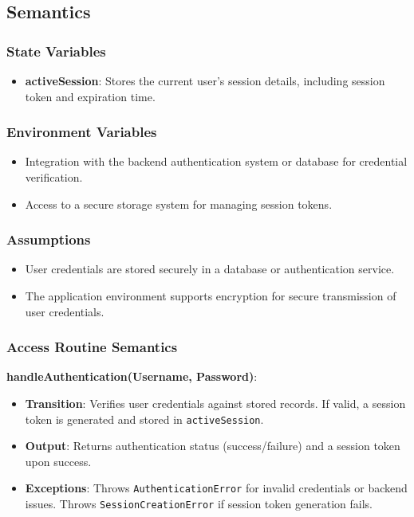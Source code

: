 \documentclass[12pt, titlepage]{article}
\begin{document}
\subsection{Semantics}

\subsubsection{State Variables}
\begin{itemize}
    \item \textbf{activeSession}: Stores the current user's session details, including session token and expiration time.
\end{itemize}

\subsubsection{Environment Variables}
\begin{itemize}
    \item Integration with the backend authentication system or database for credential verification.
    \item Access to a secure storage system for managing session tokens.
\end{itemize}

\subsubsection{Assumptions}
\begin{itemize}
    \item User credentials are stored securely in a database or authentication service.
    \item The application environment supports encryption for secure transmission of user credentials.
\end{itemize}

\subsubsection{Access Routine Semantics}

\textbf{handleAuthentication(Username, Password)}:
\begin{itemize}
    \item \textbf{Transition}: Verifies user credentials against stored records. If valid, a session token is generated and stored in \texttt{activeSession}.
    \item \textbf{Output}: Returns authentication status (success/failure) and a session token upon success.
    \item \textbf{Exceptions}: Throws \texttt{AuthenticationError} for invalid credentials or backend issues. Throws \texttt{SessionCreationError} if session token generation fails.
\end{itemize}
\end{document}
